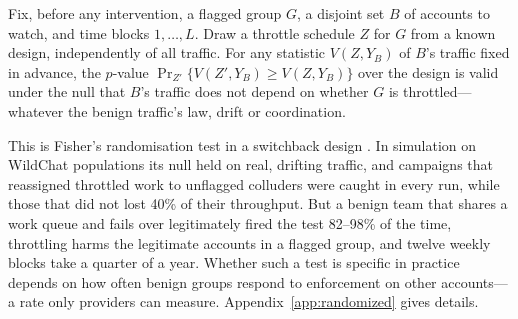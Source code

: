 \begin{proposition}\label{prop:rand}
Fix, before any intervention, a flagged group $G$, a disjoint set $B$ of accounts to watch, and time blocks $1,\dots,L$. Draw a throttle schedule $Z$ for $G$ from a known design, independently of all traffic. For any statistic $V(Z,Y_B)$ of $B$'s traffic fixed in advance, the $p$-value $\Pr_{Z'}\{V(Z',Y_B)\ge V(Z,Y_B)\}$ over the design is valid under the null that $B$'s traffic does not depend on whether $G$ is throttled---whatever the benign traffic's law, drift or coordination.
\end{proposition}

This is Fisher's randomisation test \citep{fisher1935design,imbens2015causal} in a switchback design \citep{bojinov2023design}. In simulation on WildChat populations its null held on real, drifting traffic, and campaigns that reassigned throttled work to unflagged colluders were caught in every run, while those that did not lost 40\% of their throughput. But a benign team that shares a work queue and fails over legitimately fired the test 82--98\% of the time, throttling harms the legitimate accounts in a flagged group, and twelve weekly blocks take a quarter of a year. Whether such a test is specific in practice depends on how often benign groups respond to enforcement on other accounts---a rate only providers can measure. Appendix~\ref{app:randomized} gives details.
